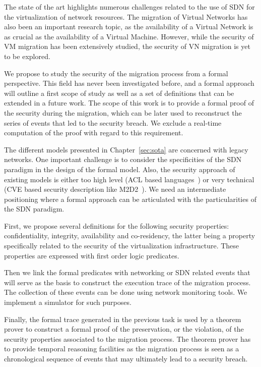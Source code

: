 The state of the art highlights numerous challenges related to the use of SDN for the virtualization of network resources.
The migration of Virtual Networks has also been an important research topic, as the availability of a Virtual Network is as crucial as the availability of a Virtual Machine.
However, while the security of VM migration has been extensively studied, the security of VN migration is yet to be explored. 

We propose to study the security of the migration process from a formal perspective. This field has never been investigated before, and a formal approach will outline a first scope of study as well as a set of definitions that can be extended in a future work.
The scope of this work is to provide a formal proof of the security during the migration, which can be later used to reconstruct the series of events that led to the security breach. We exclude a real-time computation of the proof with regard to this requirement.

The different models presented in Chapter~\ref{sec:sota} are concerned with legacy networks.
One important challenge is to consider the specificities of the SDN paradigm in the design of the formal model.
Also, the security approach of existing models is either too high level (ACL based languages~\cite{orbac,mulval-Ou2013}) or very technical (CVE based security description like M2D2~\cite{M2D2-Morin2002}).
We need an intermediate positioning where a formal approach can be articulated with the particularities of the SDN paradigm.

First, we propose several definitions for the following security properties: confidentiality, integrity, availability 
and co-residency, the latter being a property specifically related to the security of the virtualization infrastructure.
These properties are expressed with first order logic predicates.

Then we link the formal predicates with networking or SDN related events that will serve as the basis to construct the execution trace of the migration process.
The collection of these events can be done using network monitoring tools.
We implement a simulator for such purposes.

Finally, the formal trace generated in the previous task is used by a theorem prover to construct a formal proof of the preservation, or the violation, of the security properties associated to the migration process. The theorem prover has to provide temporal reasoning facilities as the migration process is seen as a chronological sequence of events that may ultimately lead to a security breach.

